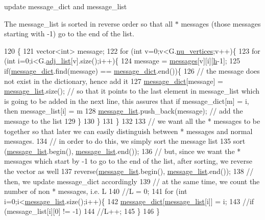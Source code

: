 update message\+\_\+dict and message\+\_\+list 

The message\+\_\+list is sorted in reverse order so that all $\ast$ messages (those messages starting with -\/1) go to the end of the list. 
\begin{DoxyCode}
120 \{
121   vector<int> message;
122   \textcolor{keywordflow}{for} (\textcolor{keywordtype}{int} v=0;v<G.\hyperlink{classmarked__graph_acf79c6aeb8f32614cb14a5baaa6c9f9b}{nu\_vertices};v++)\{
123     \textcolor{keywordflow}{for} (\textcolor{keywordtype}{int} i=0;i<G.\hyperlink{classmarked__graph_a1a0bf7ca413a278763f7c878b3b6fd6f}{adj\_list}[v].size();i++)\{
124       message = \hyperlink{classgraph__message_a06a1d1ab91b4891c65ea80205566f800}{messages}[v][i][\hyperlink{classgraph__message_a934d63ed7275c211e13c6fb68824ed46}{h}-1];
125       \textcolor{keywordflow}{if}(\hyperlink{classgraph__message_a7890d2dff06b9de6f98734c69d8fbcfd}{message\_dict}.find(message) == \hyperlink{classgraph__message_a7890d2dff06b9de6f98734c69d8fbcfd}{message\_dict}.end())\{
126         \textcolor{comment}{// the message does not exist in the dictionary, hence add it}
127         \hyperlink{classgraph__message_a7890d2dff06b9de6f98734c69d8fbcfd}{message\_dict}[message] = \hyperlink{classgraph__message_aa497f561e976cf58cc554a77e0601d8f}{message\_list}.size(); \textcolor{comment}{// so that it points to the
       last element in message\_list which is going to be added in the next line, this assures that if message\_dict[m]
       = i, then message\_list[i] = m}
128         \hyperlink{classgraph__message_aa497f561e976cf58cc554a77e0601d8f}{message\_list}.push\_back(message); \textcolor{comment}{// add the message to the list}
129       \}
130     \}
131   \}
132 
133   \textcolor{comment}{// we want all the * messages to be together so that later we can easily distinguish between * messages
       and normal messages.}
134   \textcolor{comment}{// in order to do this, we simply sort the message list}
135   sort (\hyperlink{classgraph__message_aa497f561e976cf58cc554a77e0601d8f}{message\_list}.begin(), \hyperlink{classgraph__message_aa497f561e976cf58cc554a77e0601d8f}{message\_list}.end());
136   \textcolor{comment}{// but, since we want the * messages which start by -1 to go to the end of the list, after sorting, we
       reverse the vector as well}
137   reverse(\hyperlink{classgraph__message_aa497f561e976cf58cc554a77e0601d8f}{message\_list}.begin(), \hyperlink{classgraph__message_aa497f561e976cf58cc554a77e0601d8f}{message\_list}.end());
138   \textcolor{comment}{// then, we update message\_dict accordingly}
139   \textcolor{comment}{// at the same time, we count the number of non * messages, i.e. L}
140   \textcolor{comment}{//L = 0;}
141   \textcolor{keywordflow}{for} (\textcolor{keywordtype}{int} i=0;i<\hyperlink{classgraph__message_aa497f561e976cf58cc554a77e0601d8f}{message\_list}.size();i++)\{
142     \hyperlink{classgraph__message_a7890d2dff06b9de6f98734c69d8fbcfd}{message\_dict}[\hyperlink{classgraph__message_aa497f561e976cf58cc554a77e0601d8f}{message\_list}[i]] = i;
143     \textcolor{comment}{//if (message\_list[i][0] != -1)}
144     \textcolor{comment}{//L++;}
145   \}
146 \}
\end{DoxyCode}
